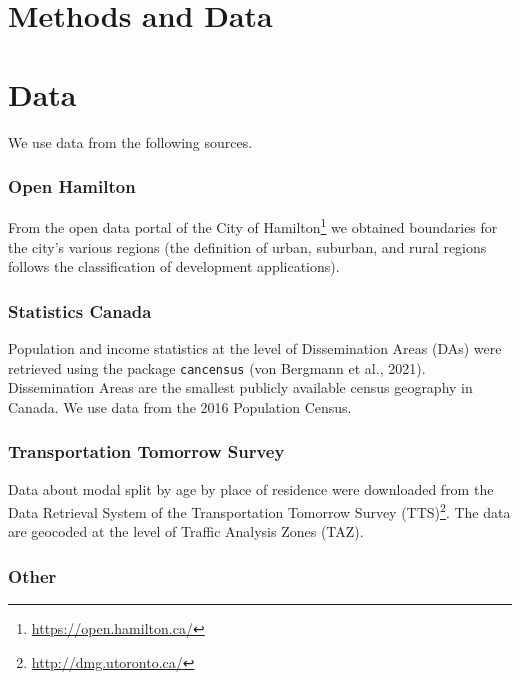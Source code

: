 \documentclass[]{elsarticle} %
\begin{document}
\hypertarget{methods-and-data}{%
\section{Methods and Data}\label{methods-and-data}}

\hypertarget{data}{%
\section{Data}\label{data}}

We use data from the following sources.

\hypertarget{open-hamilton}{%
\subsubsection{Open Hamilton}\label{open-hamilton}}

From the open data portal of the City of
Hamilton\footnote{\url{https://open.hamilton.ca/}} we obtained
boundaries for the city's various regions (the definition of urban,
suburban, and rural regions follows the classification of development
applications).

\hypertarget{statistics-canada}{%
\subsubsection{Statistics Canada}\label{statistics-canada}}

Population and income statistics at the level of Dissemination Areas
(DAs) were retrieved using the package \texttt{cancensus} (von Bergmann
et al., 2021). Dissemination Areas are the smallest publicly available
census geography in Canada. We use data from the 2016 Population Census.

\hypertarget{transportation-tomorrow-survey}{%
\subsubsection{Transportation Tomorrow
Survey}\label{transportation-tomorrow-survey}}

Data about modal split by age by place of residence were downloaded from
the Data Retrieval System of the Transportation Tomorrow Survey
(TTS)\footnote{\url{http://dmg.utoronto.ca/}}. The data are geocoded at
the level of Traffic Analysis Zones (TAZ).

\hypertarget{other}{%
\subsubsection{Other}\label{other}}
\end{document}
